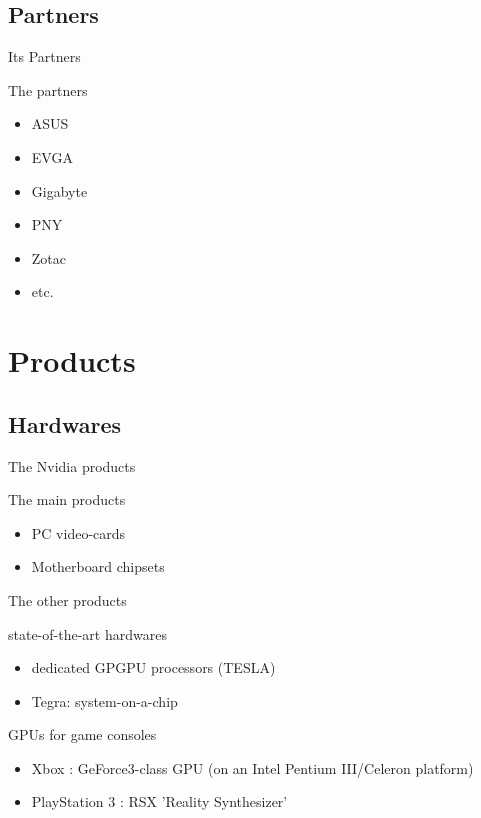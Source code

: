 \documentclass{beamer}
\begin{document}
\subsection{Partners}
\begin{frame}{Its Partners}
	\begin{block}{The partners}
		\begin{itemize}
			\item<+->{ASUS}
			\item<+->{EVGA}
			\item<+->{Gigabyte}
			\item<+->{PNY}
			\item<+->{Zotac}
			\item<+->{etc.}
		\end{itemize}
	\end{block}
\end{frame}

\section{Products}
\subsection{Hardwares}
\begin{frame}{The Nvidia products}
	\transdissolve[duration=0.1]
	\begin{block}{The main products}
		\begin{itemize}
			\item<+->{PC video-cards}
			\item<+->{Motherboard chipsets}
		\end{itemize}
	\end{block}
\end{frame}
\begin{frame}{The other products}
	\transdissolve[duration=0.1]
	\begin{block}{state-of-the-art hardwares}
		\begin{itemize}
			\item<+->{dedicated GPGPU processors (TESLA)}
			\item<+->{Tegra: system-on-a-chip}
		\end{itemize}
	\end{block}
	\begin{block}{GPUs for game consoles}
		\begin{itemize}
			\item<+->{Xbox : GeForce3-class GPU (on an Intel Pentium III/Celeron platform)}
			\item<+->{PlayStation 3 : RSX 'Reality Synthesizer'}
		\end{itemize}
	\end{block}
\end{frame}
\end{document}
